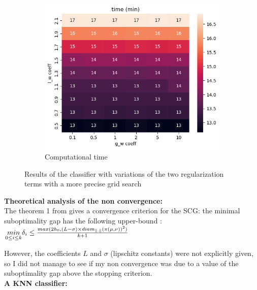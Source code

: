 \documentclass[a4paper,11pt]{article}
\begin{document}
\begin{figure}[h!]
\begin{subfigure}{0.32\textwidth}
        \label{fig:accuracy_bis}
    \end{subfigure}
    \begin{subfigure}{0.32\textwidth}
        \includegraphics[width=\textwidth]{figures/time_results_bis.png}
        \caption{Computational time}
        \label{fig:time_bis}
    \end{subfigure}
    \caption{Results of the classifier with variations of the two regularization terms with a more precise grid search}
\end{figure}


\textbf{Theoretical analysis of the non convergence: }\\

The theorem 1 from \cite{wijesinghe2021regularizedbis} gives a convergence criterion for the SCG: the minimal suboptimality gap has the following upper-bound : \\[1cm]

$
\underset{0 \leq i \leq k }{min} \delta_i \leq \frac{max(2 h_0 , (L - \sigma )\times diam_{\left\lVert . \right\rVert }(\pi(\mu, \nu))^2)}{k+1}\\
$

However, the coefficients $L$ and $\sigma$ (lipschitz constants) were not explicitly given, so I did not manage to see if my non convergence was due to a value of the suboptimality gap above the stopping criterion. \\

\textbf{A KNN classifier: }\\
\end{document}

